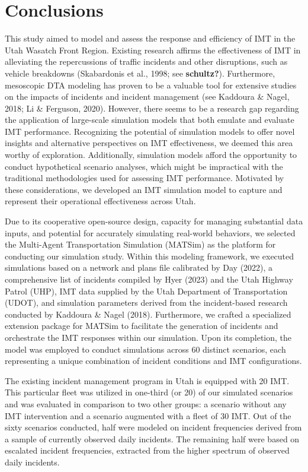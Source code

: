 \documentclass[fancy, oneside, mastersfancy, ms]{byuthesis}
\begin{document}
\hypertarget{sec-conclusions}{%
\chapter{Conclusions}\label{sec-conclusions}}

This study aimed to model and assess the response and efficiency of IMT
in the Utah Wasatch Front Region. Existing research affirms the
effectiveness of IMT in alleviating the repercussions of traffic
incidents and other disruptions, such as vehicle breakdowns (Skabardonis
et al., 1998; see \textbf{schultz?}). Furthermore, mesoscopic DTA
modeling has proven to be a valuable tool for extensive studies on the
impacts of incidents and incident management (see Kaddoura \& Nagel,
2018; Li \& Ferguson, 2020). However, there seems to be a research gap
regarding the application of large-scale simulation models that both
emulate and evaluate IMT performance. Recognizing the potential of
simulation models to offer novel insights and alternative perspectives
on IMT effectiveness, we deemed this area worthy of exploration.
Additionally, simulation models afford the opportunity to conduct
hypothetical scenario analyses, which might be impractical with the
traditional methodologies used for assessing IMT performance. Motivated
by these considerations, we developed an IMT simulation model to capture
and represent their operational effectiveness across Utah.

Due to its cooperative open-source design, capacity for managing
substantial data inputs, and potential for accurately simulating
real-world behaviors, we selected the Multi-Agent Transportation
Simulation (MATSim) as the platform for conducting our simulation study.
Within this modeling framework, we executed simulations based on a
network and plans file calibrated by Day (2022), a comprehensive list of
incidents compiled by Hyer (2023) and the Utah Highway Patrol (UHP), IMT
data supplied by the Utah Department of Transportation (UDOT), and
simulation parameters derived from the incident-based research conducted
by Kaddoura \& Nagel (2018). Furthermore, we crafted a specialized
extension package for MATSim to facilitate the generation of incidents
and orchestrate the IMT responses within our simulation. Upon its
completion, the model was employed to conduct simulations across 60
distinct scenarios, each representing a unique combination of incident
conditions and IMT configurations.

The existing incident management program in Utah is equipped with 20
IMT. This particular fleet was utilized in one-third (or 20) of our
simulated scenarios and was evaluated in comparison to two other groups:
a scenario without any IMT intervention and a scenario augmented with a
fleet of 30 IMT. Out of the sixty scenarios conducted, half were modeled
on incident frequencies derived from a sample of currently observed
daily incidents. The remaining half were based on escalated incident
frequencies, extracted from the higher spectrum of observed daily
incidents.
\end{document}

